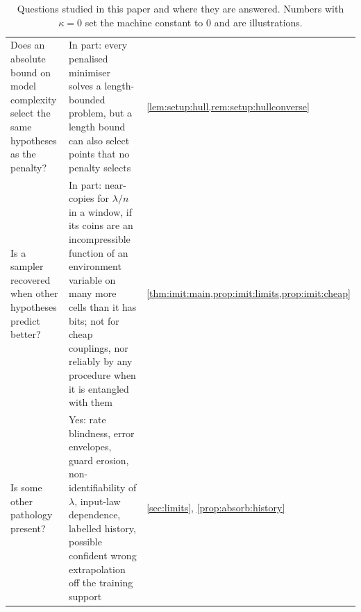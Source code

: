 \begin{table}[t]
\begin{tabularx}{\linewidth}{@{}>{\raggedright\arraybackslash}p{4.1cm}>{\raggedright\arraybackslash}X>{\raggedright\arraybackslash}p{2.3cm}@{}}
Does an absolute bound on model complexity select the same hypotheses as the penalty? & In part: every penalised minimiser solves a length-bounded problem, but a length bound can also select points that no penalty selects & \cref{lem:setup:hull,rem:setup:hullconverse}\\
Is a sampler recovered when other hypotheses predict better? & In part: near-copies for $\lambda/n$ in a window, if its coins are an incompressible function of an environment variable on many more cells than it has bits; not for cheap couplings, nor reliably by any procedure when it is entangled with them & \cref{thm:imit:main,prop:imit:limits,prop:imit:cheap}\\
Is some other pathology present? & Yes: rate blindness, error envelopes, guard erosion, non-identifiability of $\lambda$, input-law dependence, labelled history, possible confident wrong extrapolation off the training support & \cref{sec:limits}, \cref{prop:absorb:history}\\
\bottomrule
\end{tabularx}
\caption{Questions studied in this paper and where they are answered. Numbers with $\kappa=0$ set the machine constant to $0$ and are illustrations.}\label{tab:intro:claims}
\end{table}

